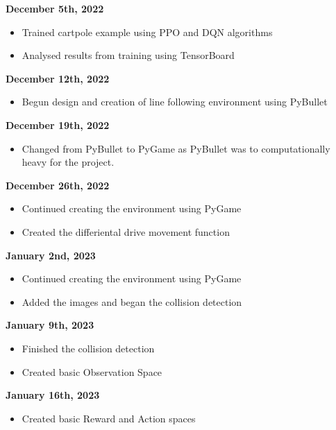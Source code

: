 \documentclass[a4paper,12pt]{article}
\begin{document}
\vspace{.7cm}
\textbf{\large December 5th, 2022}
\begin{itemize}
  \item Trained cartpole example using PPO and DQN algorithms
  \item Analysed results from training using TensorBoard

\end{itemize}
\vspace{.7cm}
\textbf{\large December 12th, 2022}
\begin{itemize}
  \item Begun design and creation of line following environment using PyBullet

\end{itemize}
\vspace{.7cm}
\textbf{\large December 19th, 2022}
\begin{itemize}
  \item Changed from PyBullet to PyGame as PyBullet was to computationally heavy for the project.

\end{itemize}
\vspace{.7cm}
\textbf{\large December 26th, 2022}
\begin{itemize}
  \item Continued creating the environment using PyGame
  \item Created the differiental drive movement function

\end{itemize}
\vspace{.7cm}
\textbf{\large January 2nd, 2023}
\begin{itemize}
  \item Continued creating the environment using PyGame
  \item Added the images and began the collision detection

\end{itemize}
\vspace{.7cm}
\textbf{\large January 9th, 2023}
\begin{itemize}
  \item Finished the collision detection
  \item Created basic Observation Space

\end{itemize}
\vspace{.7cm}
\textbf{\large January 16th, 2023}
\begin{itemize}
  \item Created basic Reward and Action spaces

\end{itemize}
\end{document}
